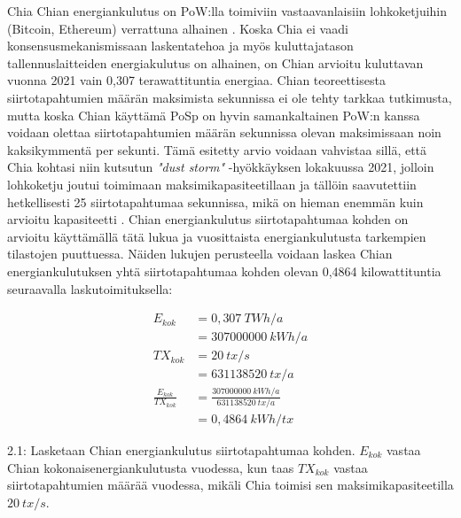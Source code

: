 \begin{subsection}{Chia\label{chia}}
Chian energiankulutus on PoW:lla toimiviin vastaavanlaisiin lohkoketjuihin (Bitcoin, Ethereum) verrattuna alhainen \cite{chiaenergy}. Koska Chia ei vaadi konsensusmekanismissaan laskentatehoa ja myös kuluttajatason tallennuslaitteiden energiakulutus on alhainen, on Chian arvioitu kuluttavan vuonna 2021 vain 0,307 terawattituntia energiaa. Chian teoreettisesta siirtotapahtumien määrän maksimista sekunnissa ei ole tehty tarkkaa tutkimusta, mutta koska Chian käyttämä PoSp on hyvin samankaltainen PoW:n kanssa voidaan olettaa siirtotapahtumien määrän sekunnissa olevan maksimissaan noin kaksikymmentä per sekunti. Tämä esitetty arvio voidaan vahvistaa sillä, että Chia kohtasi niin kutsutun \textit{"dust storm"} -hyökkäyksen lokakuussa 2021, jolloin lohkoketju joutui toimimaan maksimikapasiteetillaan ja tällöin saavutettiin hetkellisesti 25 siirtotapahtumaa sekunnissa, mikä on hieman enemmän kuin arvioitu kapasiteetti \cite{chia-tps}. Chian energiankulutus siirtotapahtumaa kohden on arvioitu käyttämällä tätä lukua ja vuosittaista energiankulutusta tarkempien tilastojen puuttuessa. Näiden lukujen perusteella voidaan laskea Chian energiankulutuksen yhtä siirtotapahtumaa kohden olevan 0,4864 kilowattituntia seuraavalla laskutoimituksella:
\begin{mycapequ}[!htbp]
\begin{equation}
\begin{split}
E_{kok} & = 0,307~TWh/a \\
 & = 307000000~kWh/a \\
TX_{kok} & = 20~tx/s \\ 
 & = 631138520~tx/a \\
\frac{E_{kok}}{TX_{kok}} & = \frac{307000000~kWh/a}{631138520~tx/a} \\
 & = 0,4864~kWh/tx
\end{split}
\end{equation}
\caption{2.1: Lasketaan Chian energiankulutus siirtotapahtumaa kohden. \(E_{kok}\) vastaa Chian kokonaisenergiankulutusta vuodessa, kun taas \(TX_{kok}\) vastaa siirtotapahtumien määrää vuodessa, mikäli Chia toimisi sen maksimikapasiteetilla \(20~tx/s\).}
\end{mycapequ}


\end{subsection}
